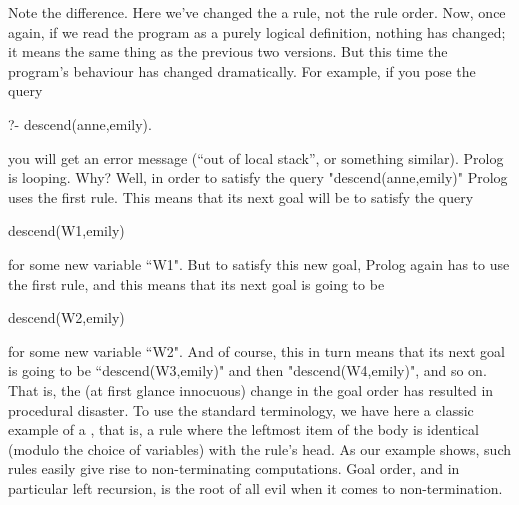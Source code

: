 Note the difference. Here we've changed the 
a rule, not the rule order.  Now, once again, if we read the
program as a purely logical definition, nothing has changed; it means
the same thing as the previous two versions. But this time the
program's behaviour has changed dramatically.  For example, if you
pose the query
\begin{LPNcodedisplay}
?- descend(anne,emily).
\end{LPNcodedisplay}
you will get an error message (``out of local stack'', or something
similar). Prolog is looping. Why?  Well, in order to satisfy the query
"descend(anne,emily)" Prolog uses the first rule. This means that
its next goal will be to satisfy the query
\begin{LPNcodedisplay}
descend(W1,emily)
\end{LPNcodedisplay}
for some new variable ``W1". But to satisfy this new goal, Prolog
again has to use the first rule, and this means that its next goal is
going to be
\begin{LPNcodedisplay}
descend(W2,emily)
\end{LPNcodedisplay}
for some new variable ``W2". And of course, this in turn means that its
next goal is going to be ``descend(W3,emily)" and then
"descend(W4,emily)", and so on.  That is, the (at first glance
innocuous) change in the goal order has resulted in procedural
disaster.  To use the standard terminology, we have here a classic
example of a , that is, a rule where the
leftmost item of the body is identical (modulo the choice of
variables) with the rule's head.  As our example shows, such rules
easily give rise to non-terminating computations.  Goal order, and in
particular left recursion, is the root of all evil when it comes to
non-termination.

